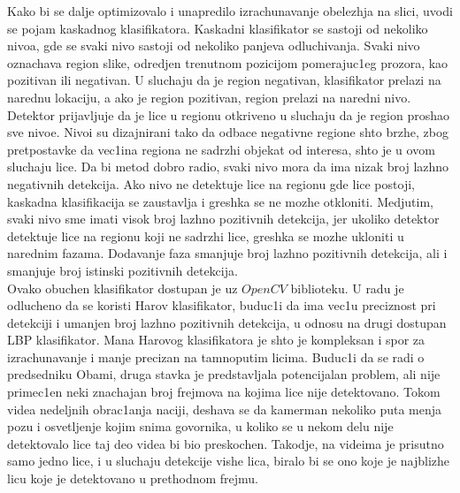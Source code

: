 \documentclass[a4paper, openany, oneside, 11pt]{book}
\begin{document}
Kako bi se dalje optimizovalo i unapredilo izrachunavanje obelezhja na slici, uvodi se pojam kaskadnog klasifikatora. Kaskadni klasifikator se sastoji od nekoliko nivoa, gde se svaki nivo sastoji od nekoliko panjeva odluchivanja. Svaki nivo oznachava region slike, odredjen trenutnom pozicijom pomerajuc1eg prozora, kao pozitivan ili negativan. U sluchaju da je region negativan, klasifikator prelazi na narednu lokaciju, a ako je region pozitivan, region prelazi na naredni nivo. Detektor prijavljuje da je lice u regionu otkriveno u sluchaju da je region proshao sve nivoe. Nivoi su dizajnirani tako da odbace negativne regione shto brzhe, zbog pretpostavke da vec1ina regiona ne sadrzhi objekat od interesa, shto je u ovom sluchaju lice. Da bi metod dobro radio, svaki nivo mora da ima nizak broj lazhno negativnih detekcija. Ako nivo ne detektuje lice na regionu gde lice postoji, kaskadna klasifikacija se zaustavlja i greshka se ne mozhe otkloniti. Medjutim, svaki nivo sme imati visok broj lazhno pozitivnih detekcija, jer ukoliko detektor detektuje lice na regionu koji ne sadrzhi lice, greshka se mozhe ukloniti u narednim fazama. Dodavanje faza smanjuje broj lazhno pozitivnih detekcija, ali i smanjuje broj istinski pozitivnih detekcija.\\
Ovako obuchen klasifikator dostupan je uz $OpenCV$ biblioteku. U radu je odlucheno da se koristi Harov klasifikator, buduc1i da ima vec1u preciznost pri detekciji i umanjen broj lazhno pozitivnih detekcija, u odnosu na drugi dostupan \acrshort{LBP} klasifikator. Mana Harovog klasifikatora je shto je kompleksan i spor za izrachunavanje i manje precizan na tamnoputim licima. Buduc1i da se radi o predsedniku Obami, druga stavka je predstavljala potencijalan problem, ali nije primec1en neki znachajan broj frejmova na kojima lice nije detektovano. Tokom videa nedeljnih obrac1anja naciji, deshava se da kamerman nekoliko puta menja pozu i osvetljenje kojim snima govornika, u koliko se u nekom delu nije detektovalo lice taj deo videa bi bio preskochen. Takodje, na videima je prisutno samo jedno lice, i u sluchaju detekcije vishe lica, biralo bi se ono koje je najblizhe licu koje je detektovano u prethodnom frejmu.
\end{document}
